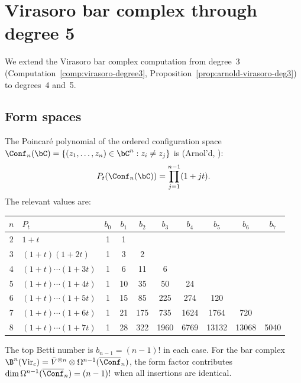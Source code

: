 \section{Virasoro bar complex through degree 5}
\label{sec:virasoro-deg45}

We extend the Virasoro bar complex computation from degree~3
(Computation~\ref{comp:virasoro-degree3}, Proposition~\ref{prop:arnold-virasoro-deg3})
to degrees~4 and~5.

\subsection{Form spaces}

\begin{computation}
\label{comp:poincare-config}
The Poincar\'{e} polynomial of the ordered configuration space
$\Conf_n(\bC) = \{(z_1, \ldots, z_n) \in \bC^n : z_i \neq z_j\}$
is (Arnol'd, \cite{Arnold69}):
\begin{equation}\label{eq:poincare-config}
P_t(\Conf_n(\bC)) = \prod_{j=1}^{n-1}(1 + jt).
\end{equation}
The relevant values are:
\begin{center}
\renewcommand{\arraystretch}{1.15}
{\small
\begin{tabular}{c|l|cccccccc}
$n$ & $P_t$ & $b_0$ & $b_1$ & $b_2$ & $b_3$ & $b_4$ & $b_5$ & $b_6$ & $b_7$ \\
\hline
2 & $1 + t$ & 1 & 1 \\
3 & $(1+t)(1+2t)$ & 1 & 3 & 2 \\
4 & $(1+t)\cdots(1+3t)$ & 1 & 6 & 11 & 6 \\
5 & $(1+t)\cdots(1+4t)$ & 1 & 10 & 35 & 50 & 24 \\
6 & $(1+t)\cdots(1+5t)$ & 1 & 15 & 85 & 225 & 274 & 120 \\
7 & $(1+t)\cdots(1+6t)$ & 1 & 21 & 175 & 735 & 1624 & 1764 & 720 \\
8 & $(1+t)\cdots(1+7t)$ & 1 & 28 & 322 & 1960 & 6769 & 13132 & 13068 & 5040
\end{tabular}
}
\end{center}
The top Betti number is $b_{n-1} = (n-1)!$ in each case.
For the bar complex $\B^n(\mathrm{Vir}_c) = \bar{V}^{\otimes n}
\otimes \Omega^{n-1}(\overline{\Conf}_n)$, the form factor
contributes $\dim \Omega^{n-1}(\overline{\Conf}_n) = (n-1)!$
when all insertions are identical.
\end{computation}

